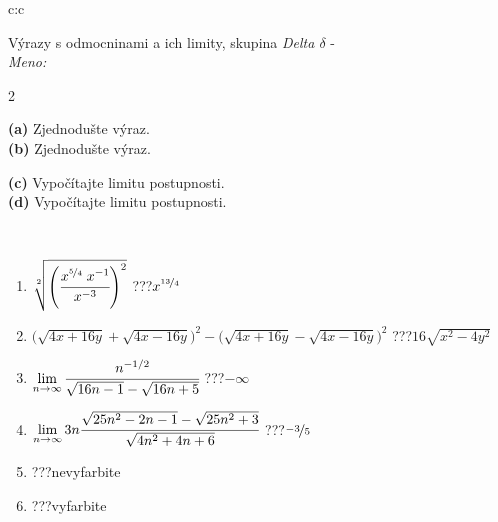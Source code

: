 \documentclass[10pt]{report}
\begin{document}
\begin{tabular}{c:c}
\begin{minipage}[c][104.5mm][t]{0.5\linewidth}
\begin{center}
\vspace{7mm}
{\huge {\Large Výrazy s odmocninami a ich limity}, skupina \textit{Delta $\delta$} -}\\[5mm]
\textit{Meno:}\phantom{xxxxxxxxxxxxxxxxxxxxxxxxxxxxxxxxxxxxxxxxxxxxxxxxxxxxxxxxxxxxxxxxx}\\[5mm]
\begin{minipage}{0.95\linewidth}
\begin{center}
{\small \begin{multicols}{2} \raggedright
\phantom{xxxxxxxxx}\textbf{(a)} Zjednodušte výraz. \\[1mm]
\phantom{xxxxxxxxx}\textbf{(b)} Zjednodušte výraz. \par \columnbreak
\textbf{(c)} Vypočítajte limitu postupnosti. \\[1mm]
\textbf{(d)} Vypočítajte limitu postupnosti.
\end{multicols}
}
\end{center}
\end{minipage}
\\[4mm]
\begin{minipage}{0.79\linewidth}
\begin{center}
\begin{varwidth}{\linewidth}
\begin{enumerate}
\small
\item $\sqrt[2]{\left(\cfrac{x^{\nicefrac{5}{4}}\;x^{-1}}{x^{-3}}\right)^{2}}$\quad \dotfill\; ???\;\dotfill \quad $x^{\nicefrac{13}{4}}$
\item {\footnotesize{\scriptsize$\big(\sqrt{4x+16y}+\sqrt{4x-16y}\big)^2-\big(\sqrt{4x+16y}-\sqrt{4x-16y}\big)^2$}\quad \dotfill\; ???\;\dotfill \quad $16\sqrt{x^2-4y^2}$}
\item $\lim\limits_{n\to\infty}\cfrac{n^{-1/2}}{\sqrt{16n-1}-\sqrt{16n+5}}$\quad \dotfill\; ???\;\dotfill \quad $-\infty$
\item $\lim\limits_{n\to\infty}3n\cfrac{\sqrt{25n^2-2n-1}-\sqrt{25n^2+3}}{\sqrt{4n^2+4n+6}}$\quad \dotfill\; ???\;\dotfill \quad $\nicefrac{-3}{5}$
\item \quad \dotfill\; ???\;\dotfill \quad nevyfarbite
\item \quad \dotfill\; ???\;\dotfill \quad vyfarbite
\end{enumerate}
\end{varwidth}

\end{center}
\end{minipage}
\end{center}
\end{minipage}
\end{tabular}
\end{document}
